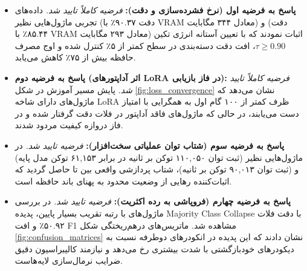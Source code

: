 \documentclass[12pt,a4paper]{report}
\theoremstyle{definition}
\begin{document}
\begin{itemize}
    \item \textbf{پاسخ به فرضیه اول (نرخ فشرده‌سازی و دقت):}
    \textit{فرضیه کاملاً تایید شد.} داده‌های تجربی ماژول‌هایی نظیر  (دقت ۹۰.۳۷٪ با VRAM معادل ۳۴۴ مگابایت) و  (دقت ۸۵.۴۴٪ با VRAM معادل ۲۹۳ مگابایت) اثبات نمودند که با تعیین آستانه انرژی تکین $\tau \ge 0.90$، افت دقت دسته‌بندی در سطح کمتر از ۵٪ کنترل شده و اوج مصرف حافظه بیش از ۷۵٪ کاهش می‌یابد.

    \item \textbf{پاسخ به فرضیه دوم (اثر آداپتورهای LoRA در فاز بازیابی):}
    \textit{فرضیه کاملاً تایید شد.} پایش مسیر آموزش در شکل \ref{fig:loss_convergence} نشان می‌دهد که ماژول‌های دارای شاخه LoRA ظرف کمتر از ۱۰۰ گام اول به همگرایی با امتیاز  دست می‌یابند، در حالی که ماژول‌های فاقد آداپتور در فلات دقت گرفتار شده و در فاز دروازه کیفیت مردود شدند.

    \item \textbf{پاسخ به فرضیه سوم (شتاب توان عملیاتی سخت‌افزار):}
    \textit{فرضیه تایید شد.} در ماژول‌هایی نظیر  (ثبت توان ۱۱۰,۰۵۰ توکن بر ثانیه در برابر ۶۱,۱۵۳ توکن مدل پایه) و  (ثبت توان ۹۰,۰۱۳ توکن بر ثانیه)، شتاب پردازشی واقعی بین  تا  حاصل گردید که اثبات‌کننده رهایی از وضعیت محدود به پهنای باند حافظه  است.

    \item \textbf{پاسخ به فرضیه چهارم (فروپاشی به رده اکثریت):}
    \textit{فرضیه تایید شد.} در بررسی ماژول‌های با رتبه تقریب بسیار پایین، پدیده Majority Class Collapse با دقت فلات ۵۰.۹۲٪ و افت F1 مشاهده شد. ماتریس‌های درهم‌ریختگی شکل \ref{fig:confusion_matrices} نشان دادند که این پدیده در انکودرهای دوطرفه نسبت به دیکودرهای خودبازگشتی با شدت بیشتری رخ می‌دهد و نیازمند کالیبراسیون دقیق ضرایب نرمال‌سازی لایه‌هاست.
\end{itemize}
\end{document}
